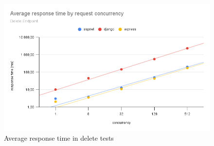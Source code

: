 \begin{figure}[H]
    \includegraphics[width=\columnwidth]{figures/pictures/resultsDelete.png}
    \caption{Average response time in delete tests}
    \label{fig:resultsDelete}
\end{figure}
